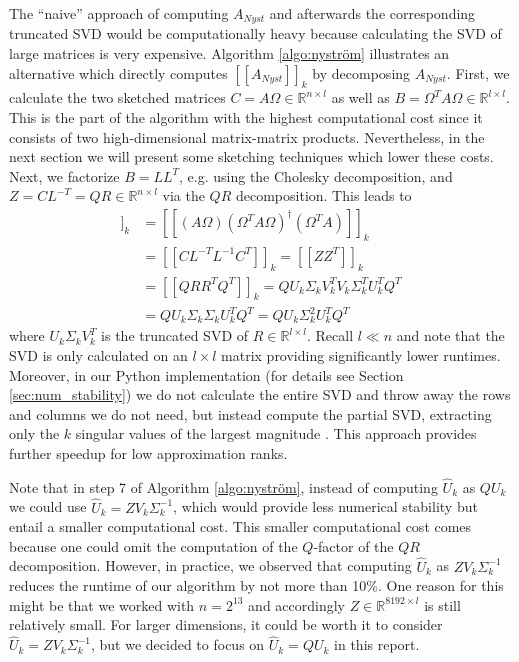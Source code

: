 \documentclass{article}
\theoremstyle{definition}
\begin{document}
The \enquote{naive} approach of computing $A_{Nyst}$ and afterwards the
corresponding truncated SVD would be computationally heavy because calculating
the SVD of large matrices is very expensive. Algorithm \ref{algo:nyström}
illustrates an alternative which directly computes $[\![A_{Nyst}]\!]_k$ by
decomposing $A_{Nyst}$. First, we calculate the two sketched matrices $C = A
\Omega \in \mathbb{R}^{n \times l}$ as well as $B = \Omega^T A \Omega \in
\mathbb{R}^{l \times l}$. This is the part of the algorithm with the highest
computational cost since it consists of two high-dimensional matrix-matrix
products. Nevertheless, in the next section we will present some sketching
techniques which lower these costs. Next, we factorize $B = LL^T$, e.g. using
the Cholesky decomposition, and $Z = C L^{-T} = QR \in \mathbb{R}^{n \times l}$
via the $QR$ decomposition. This leads to
\begin{align*}
    [\![A_{Nyst}]\!]_k
    &= [\![(A \Omega) (\Omega^T A \Omega)^\dagger (\Omega^T A)]\!]_k\\
    &= [\![CL^{-T}L^{-1}C^T]\!]_k = [\![ZZ^T]\!]_k \\
    &= [\![QRR^TQ^T]\!]_k = QU_k\Sigma_k V_k^T V_k \Sigma_k^T U_k^TQ^T\\
    &= QU_k\Sigma_k \Sigma_k U_k^TQ^T = QU_k\Sigma_k^2 U_k^TQ^T
\end{align*}
where $U_k \Sigma_k V_k^T$ is the truncated SVD of $R \in \mathbb{R}^{l \times
l}$. Recall $l \ll n$ and note that the SVD is only calculated on an $l \times
l$ matrix providing significantly lower runtimes. Moreover, in our Python
implementation (for details see Section \ref{sec:num_stability}) we do not
calculate the entire SVD and throw away the rows and columns we do not need, but
instead compute the partial SVD, extracting only the $k$ singular values of the
largest magnitude \cite{scipy_svds}. This approach provides further speedup for
low approximation ranks.\newline

Note that in step 7 of Algorithm \ref{algo:nyström}, instead of computing
$\hat{U}_k$ as $Q U_k$ we could use $\hat{U}_k = Z V_k \Sigma_k^{-1}$, which
would provide less numerical stability but entail a smaller computational cost.
This smaller computational cost comes because one could omit the computation of
the $Q$-factor of the $QR$ decomposition. However, in practice, we observed that
computing $\hat{U}_k$ as $Z V_k \Sigma_k^{-1}$ reduces the runtime of our
algorithm by not more than 10\%. One reason for this might be that we worked
with $n=2^{13}$ and accordingly $Z \in \mathbb{R}^{8192 \times l}$ is still
relatively small. For larger dimensions, it could be worth it to consider
$\hat{U}_k = Z V_k \Sigma_k^{-1}$, but we decided to focus on $\hat{U}_k = Q
U_k$ in this report.\newline
\end{document}
